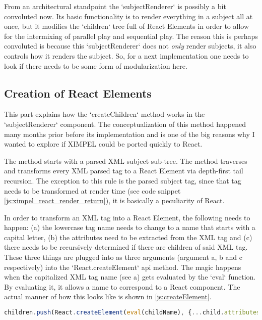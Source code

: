 From an architectural standpoint the `subjectRenderer` is possibly a bit convoluted now. Its basic functionality is to render everything in a subject all at once, but it modifies the `children` tree full of React Elements in order to allow for the intermixing of parallel play and sequential play. The reason this is perhaps convoluted is because this `subjectRenderer` does not \textit{only} render subjects, it also controls how it renders the subject. So, for a next implementation one needs to look if there needs to be some form of modularization here.

\subsection{Creation of React Elements}
This part explains how the `createChildren` method works in the `subjectRenderer` component. The conceptualization of this method happened many months prior before its implementation and is one of the big reasons why I wanted to explore if XIMPEL could be ported quickly to React.

The method starts with a parsed XML subject sub-tree. The method traverses and transforms every XML parsed tag to a React Element via depth-first tail recursion. The exception to this rule is the parsed subject tag, since that tag needs to be transformed at render time (see code snippet \ref{js:ximpel_react_render_return}), it is basically a peculiarity of React. 

In order to transform an XML tag into a React Element, the following needs to happen: (a) the lowercase tag name needs to change to a name that starts with a capital letter, (b) the attributes need to be extracted from the XML tag and (c) there needs to be recursively determined if there are children of said XML tag. These three things are plugged into as three arguments (argument a, b and c respectively) into the `React.createElement` api method. The magic happens when the capitalized XML tag name (see a) gets evaluated by the `eval` function. By evaluating it, it allows a name to correspond to a React component. The actual manner of how this looks like is shown in \ref{js:createElement}.

\begin{lstlisting}[language=JavaScript, caption=caption is in the comments \textbf{to do}, label=js:createElement]
children.push(React.createElement(eval(childName), {...child.attributes, text: child.text}, grandChildren));
\end{lstlisting}

